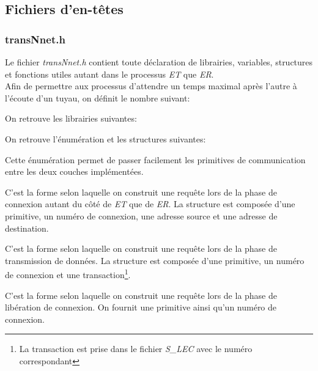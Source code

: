 \documentclass[11pt,french]{article}
\begin{document}
	\subsection{Fichiers d'en-têtes}
	\label{sub:fich-entetes-transport-entity}
		\subsubsection{transNnet.h}
		\label{ssub:transNnet.h}
			Le fichier \emph{transNnet.h} contient toute déclaration de librairies, variables, structures et fonctions utiles
			autant dans le processus \emph{ET} que \emph{ER}.\\

			Afin de permettre aux processus d'attendre un temps maximal après l'autre à l'écoute d'un tuyau,
			on définit le nombre suivant:
			

            \vspace{0.5cm}

            On retrouve les librairies suivantes:
            

            \vspace{0.5cm}

			On retrouve l'énumération et les structures suivantes:
			
            
			Cette énumération permet de passer facilement les primitives de communication entre les deux couches implémentées.
			
            
            C'est la forme selon laquelle on construit une requête lors de la phase de connexion autant du côté de \emph{ET} que de \emph{ER}. 
            La structure est composée d'une primitive, un numéro de connexion, une adresse source et une adresse de destination.

            
            C'est la forme selon laquelle on construit une requête lors de la phase de transmission de données. La structure est composée d'une primitive,
            un numéro de connexion et une transaction\footnote{La transaction est prise dans le fichier \emph{S\_LEC} avec le numéro correspondant}.

            
            C'est la forme selon laquelle on construit une requête lors de la phase de libération de connexion. On fournit une primitive ainsi qu'un 
            numéro de connexion.
\end{document}
